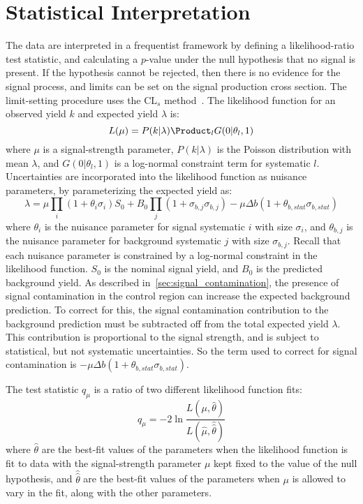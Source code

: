 \section{Statistical Interpretation}\label{sec:results_stats}

The data are interpreted in a frequentist framework by defining a likelihood-ratio test statistic, and calculating a $p$-value under the null hypothesis that no signal is present.
If the hypothesis cannot be rejected, then there is no evidence for the signal process, and limits can be set on the signal production cross section.
The limit-setting procedure uses the $\text{CL}_s$ method~\cite{results-stats-asymptotic,results-stats-cls}.
The likelihood function for an observed yield $k$ and expected yield $\lambda$ is:
\begin{equation}
    L(\mu) = P(k|\lambda)\Product_{l}G(0|\theta_{l}, 1)
\end{equation}
where $\mu$ is a signal-strength parameter, $P(k|\lambda)$ is the Poisson distribution with mean $\lambda$, and $G(0|\theta_{l}, 1)$ is a log-normal constraint term for systematic $l$.
Uncertainties are incorporated into the likelihood function as nuisance parameters, by parameterizing the expected yield as:
\begin{equation}
    \lambda = \mu\prod_{i}(1+\theta_i \sigma_i)S_0 +B_{0}\prod_j (1+\sigma_{b,j}\sigma_{b,j}) - \mu\Delta b (1+\theta_{b,stat}\sigma_{b,stat})
\end{equation}
where $\theta_i$ is the nuisance parameter for signal systematic $i$ with size $\sigma_i$, and $\theta_{b,j}$ is the nuisance parameter for background systematic $j$ with size $\sigma_{b,j}$.
Recall that each nuisance parameter is constrained by a log-normal constraint in the likelihood function.
$S_0$ is the nominal signal yield, and $B_0$ is the predicted background yield.
As described in~\ref{sec:signal_contamination}, the presence of signal contamination in the control region can increase the expected background prediction.
To correct for this, the signal contamination contribution to the background prediction must be subtracted off from the total expected yield $\lambda$.
This contribution is proportional to the signal strength, and is subject to statistical, but not systematic uncertainties.
So the term used to correct for signal contamination is $-\mu\Delta b(1+\theta_{b,stat}\sigma_{b,stat})$.

The test statistic $q_{\mu}$ is a ratio of two different likelihood function fits:
\begin{equation}
    q_{\mu} = -2\ln \frac{L(\mu, \hat{\theta})}{L(\hat{\mu}, \hat{\hat{\theta}})}
\end{equation}
where $\hat{\theta}$ are the best-fit values of the parameters when the likelihood function is fit to data with the signal-strength parameter $\mu$ kept fixed to the value of the null hypothesis,
and $\hat{\hat{\theta}}$ are the best-fit values of the parameters when $\mu$ is allowed to vary in the fit, along with the other parameters.

